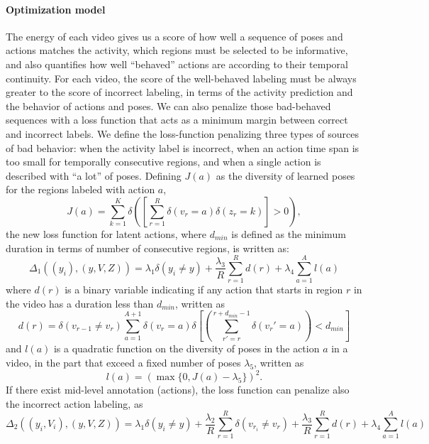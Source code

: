 \documentclass[10pt,letterpaper]{article}
\newcommand{\+}[1]{\ensuremath{{\boldsymbol #1}}}
\begin{document}
\paragraph{Optimization model}
The energy of each video gives us a score of how well a sequence of poses and actions matches the activity, which regions must be selected to be informative, and also quantifies how well ``behaved'' actions are according to their temporal continuity. For each video, the score of the well-behaved labeling must be always greater to the score of incorrect labeling, in terms of the activity prediction and the behavior of actions and poses. We can also penalize those bad-behaved sequences with a loss function that acts as a minimum margin between correct and incorrect labels. We define the loss-function penalizing three types of sources of bad behavior: when the activity label is incorrect, when an action time span is too small for temporally consecutive regions, and when a single action is described with ``a lot'' of poses. Defining $J(a)$ as the diversity of learned poses for the regions labeled with action $a$, 
\begin{equation}
J(a) =\sum_{k=1}^K \delta \left( \left[ \sum_{r=1}^R \delta(v_{r} = a)\delta(z_{r}=k) \right] > 0 \right),
\end{equation}
the new loss function for latent actions, where $d_{min}$ is defined as the minimum duration in terms of number of consecutive regions, is written as:
%
\begin{equation}
\label{new_loss_func}
\Delta_1( (y_i), (y, V, Z)) =
  \lambda_1 \delta(y_i \neq y)
+  \frac{\lambda_3}{R} \sum_{r=1}^R d(r)   + \lambda_4 \sum_{a=1}^A l(a)
\end{equation}
%
where $d(r)$ is a binary variable indicating if any action that starts in region $r$ in the video has a duration less than $d_{min}$, written as
\begin{equation}
d(r)=\delta(v_{r-1} \neq v_r) \sum_{a=1}^{A+1} \delta(v_{r} =a)\delta \left[ \left( \sum_{r'=r}^{r+d_{min}-1} \delta(v_r'=a) \right) < d_{min}\right]
\end{equation}
%
and $l(a)$ is a quadratic function on the diversity of poses in the action $a$ in a video, in the part that exceed a fixed number of poses $\lambda_5$, written as
\begin{equation}
l(a) =  \left(  \max\{0, J(a) - \lambda_5 \}\right)^2.
\end{equation}
%
If there exist mid-level annotation (actions), the loss function can penalize also the incorrect action labeling, as
 \begin{equation}
\label{new_loss_func}
\Delta_2( (y_i, V_i), (y, V, Z)) =
  \lambda_1 \delta(y_i \neq y)
+  \frac{\lambda_2}{R}  \sum_{r=1}^R \delta(v_{r_i} \neq v_{r} ) +\frac{\lambda_3}{R} \sum_{r=1}^R d(r)   + \lambda_4 \sum_{a=1}^A l(a)
\end{equation}
\end{document}
